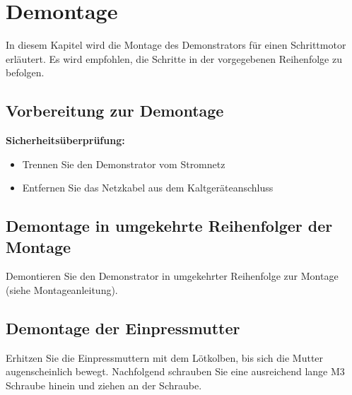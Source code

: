 %

\chapter{Demontage}
In diesem Kapitel wird die Montage des Demonstrators für einen Schrittmotor erläutert. Es wird empfohlen, die Schritte in der vorgegebenen Reihenfolge zu befolgen.


\section{ Vorbereitung zur Demontage}

\textbf{Sicherheitsüberprüfung:}\begin{itemize}
		\item Trennen Sie den Demonstrator vom Stromnetz 
		\item Entfernen Sie das Netzkabel aus dem Kaltgeräteanschluss
	\end{itemize}

\section{ Demontage in umgekehrte Reihenfolger der Montage}

Demontieren Sie den Demonstrator in umgekehrter Reihenfolge zur Montage (siehe Montageanleitung).

\section{ Demontage der Einpressmutter}

Erhitzen Sie die Einpressmuttern mit dem Lötkolben, bis sich die Mutter augenscheinlich bewegt. Nachfolgend schrauben Sie eine ausreichend lange M3 Schraube hinein und ziehen an der Schraube.

